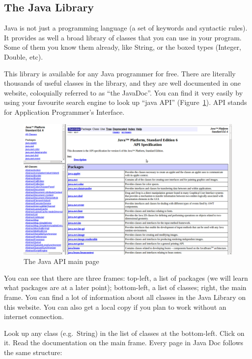 \subsection{The Java Library}
\label{sec:java-api}

Java is not just a programming language (a set of keywords and
syntactic rules). It provides as well a broad library of classes that
you can use in your program. Some of them you know them already, like
String, or the boxed types (Integer, Double, etc). 

This library is available for any Java programmer for free. There are
literally thousands of useful classes in the library, and they are
well documented in one website, coloquially referred to as ``the
JavaDoc''. You can find it very easily by using your favourite search
engine to look up ``java API'' (Figure~\ref{fig:ajavadoc}). API stands
for Application Programmer's Interface. 

\begin{figure}[tbhp]
  \centering
  \includegraphics[width=\textwidth]{gfx/javadoc}
  \caption{The Java API main page}
  \label{fig:ajavadoc}
\end{figure}

You can see that there are three frames: top-left, a list of packages
(we will learn what packages are at a later point); bottom-left, a
list of classes; right, the main frame. You can find a lot of
information about all classes in the Java Library on this website. You
can also get a local copy if you plan to work without an internet
connection. 

Look up any class (e.g.~String) in the list of classes at the
bottom-left. Click on it. Read the documentation on the main
frame. Every page in Java Doc follows the same structure: 


